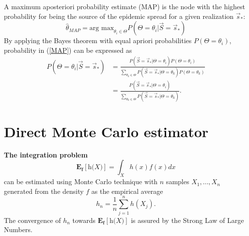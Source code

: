 \documentclass[times, utf8, diplomski]{fer}
\begin{document}
A maximum aposteriori probability estimate (MAP) is the node with the highest probability for being the source of the epidemic spread for a given realization $\vec s_*$: 
\begin{equation}
\hat{\theta}_{MAP} = \text{arg max}_{\theta_i \in \Theta} P(\Theta = \theta_i | \vec{S} = \vec s_*)
\label{MAP}
\end{equation}
By applying the Bayes theorem with equal apriori probabilities $P(\Theta = \theta_i)$, probability in (\ref{MAP}) can be expressed as 
\begin{equation}
\begin{aligned}
P(\Theta = \theta_i | \vec{S} = \vec s_*) &= \frac{P(\vec S = \vec s_* | \Theta = \theta_i) P(\Theta = \theta_i)}{\sum_{\theta_k \in \Theta} P(\vec S = \vec s_* | \Theta = \theta_k) P(\Theta = \theta_k)} \\ &= \frac{P(\vec S = \vec s_* | \Theta = \theta_i)}{\sum_{\theta_k \in \Theta} P(\vec S = \vec s_* | \Theta = \theta_k)}.
\end{aligned}
\label{MAP_pravi}
\end{equation}

\section{Direct Monte Carlo estimator}

\textbf{The integration problem}
\begin{equation}
\mathbf{E_f[\textit{h(X)}]} = \int_{X} h(x) f(x) dx
\label{exp}
\end{equation} can be estimated using Monte Carlo technique with $n$ samples $X_1, \ldots, X_n$ generated from the density $f$ as the empirical average 
\begin{equation}
h_n = \frac{1}{n} \sum_{j = 1}^{n} h(X_j).
\end{equation}
The convergence of $h_n$ towards $\mathbf{E_f[\textit{h(X)}]}$ is assured by the Strong Law of Large Numbers.
\end{document}
